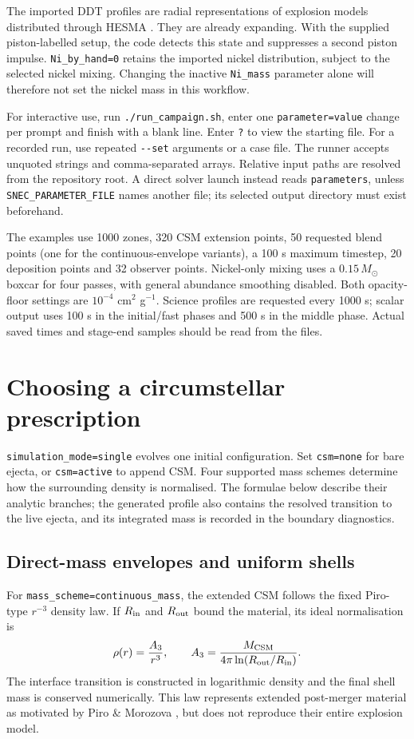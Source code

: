 \documentclass[11pt,a4paper]{article}
\newcommand{\code}[1]{\nolinkurl{#1}}
\newcommand{\Msun}{M_{\odot}}
\begin{document}
The imported DDT profiles are radial representations of explosion models distributed through HESMA \cite{hesma2017,seitenzahl2013}. They are already expanding. With the supplied piston-labelled setup, the code detects this state and suppresses a second piston impulse. \code{Ni_by_hand=0} retains the imported nickel distribution, subject to the selected nickel mixing. Changing the inactive \code{Ni_mass} parameter alone will therefore not set the nickel mass in this workflow.

For interactive use, run \code{./run_campaign.sh}, enter one \code{parameter=value} change per prompt and finish with a blank line. Enter \code{?} to view the starting file. For a recorded run, use repeated \code{--set} arguments or a case file. The runner accepts unquoted strings and comma-separated arrays. Relative input paths are resolved from the repository root. A direct solver launch instead reads \code{parameters}, unless \code{SNEC_PARAMETER_FILE} names another file; its selected output directory must exist beforehand.

The examples use 1000 zones, 320 CSM extension points, 50 requested blend points (one for the continuous-envelope variants), a 100 s maximum timestep, 20 deposition points and 32 observer points. Nickel-only mixing uses a $0.15\,\Msun$ boxcar for four passes, with general abundance smoothing disabled. Both opacity-floor settings are $10^{-4}$ cm$^2$ g$^{-1}$. Science profiles are requested every 1000 s; scalar output uses 100 s in the initial/fast phases and 500 s in the middle phase. Actual saved times and stage-end samples should be read from the files.

\section{Choosing a circumstellar prescription}
\code{simulation_mode=single} evolves one initial configuration. Set \code{csm=none} for bare ejecta, or \code{csm=active} to append CSM. Four supported mass schemes determine how the surrounding density is normalised. The formulae below describe their analytic branches; the generated profile also contains the resolved transition to the live ejecta, and its integrated mass is recorded in the boundary diagnostics.

\subsection{Direct-mass envelopes and uniform shells}
For \code{mass_scheme=continuous_mass}, the extended CSM follows the fixed Piro-type $r^{-3}$ density law. If $R_{\rm in}$ and $R_{\rm out}$ bound the material, its ideal normalisation is
\begin{equation}
 \rho(r)=\frac{A_3}{r^3},\qquad A_3=\frac{M_{\rm CSM}}{4\pi\ln(R_{\rm out}/R_{\rm in})} .
 \label{eq:direct}
\end{equation}
The interface transition is constructed in logarithmic density and the final shell mass is conserved numerically. This law represents extended post-merger material as motivated by Piro \& Morozova \cite{piro2016}, but does not reproduce their entire explosion model.
\end{document}
